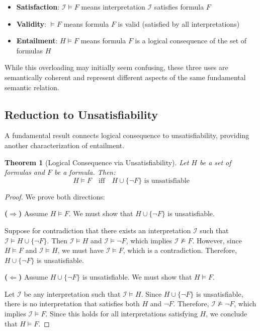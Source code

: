 \documentclass[11pt,a4paper]{article}
\theoremstyle{definition}
\theoremstyle{plain}
\newtheorem{theorem}{Theorem}[section]
\theoremstyle{remark}
\begin{document}
\begin{itemize}
    \item \textbf{Satisfaction}: $\mathcal{I} \models F$ means interpretation $\mathcal{I}$ satisfies formula $F$
    \item \textbf{Validity}: $\models F$ means formula $F$ is valid (satisfied by all interpretations)
    \item \textbf{Entailment}: $H \models F$ means formula $F$ is a logical consequence of the set of formulas $H$
\end{itemize}

While this overloading may initially seem confusing, these three uses are semantically coherent and represent different aspects of the same fundamental semantic relation.

\subsection{Reduction to Unsatisfiability}

A fundamental result connects logical consequence to unsatisfiability, providing another characterization of entailment.

\begin{tcolorbox}[colback=yellow!10!white,colframe=yellow!75!black,title=\textbf{Key Theorem: Reduction to Unsatisfiability}]
\begin{theorem}[Logical Consequence via Unsatisfiability]
Let $H$ be a set of formulas and $F$ be a formula. Then:
\[
H \models F \quad \text{iff} \quad H \cup \{\neg F\} \text{ is unsatisfiable}
\]
\end{theorem}
\end{tcolorbox}

\begin{proof}
We prove both directions:

\textbf{($\Rightarrow$)} Assume $H \models F$. We must show that $H \cup \{\neg F\}$ is unsatisfiable.

Suppose for contradiction that there exists an interpretation $\mathcal{I}$ such that $\mathcal{I} \models H \cup \{\neg F\}$. Then $\mathcal{I} \models H$ and $\mathcal{I} \models \neg F$, which implies $\mathcal{I} \not\models F$. However, since $H \models F$ and $\mathcal{I} \models H$, we must have $\mathcal{I} \models F$, which is a contradiction. Therefore, $H \cup \{\neg F\}$ is unsatisfiable.

\textbf{($\Leftarrow$)} Assume $H \cup \{\neg F\}$ is unsatisfiable. We must show that $H \models F$.

Let $\mathcal{I}$ be any interpretation such that $\mathcal{I} \models H$. Since $H \cup \{\neg F\}$ is unsatisfiable, there is no interpretation that satisfies both $H$ and $\neg F$. Therefore, $\mathcal{I} \not\models \neg F$, which implies $\mathcal{I} \models F$. Since this holds for all interpretations satisfying $H$, we conclude that $H \models F$.
\end{proof}
\end{document}
